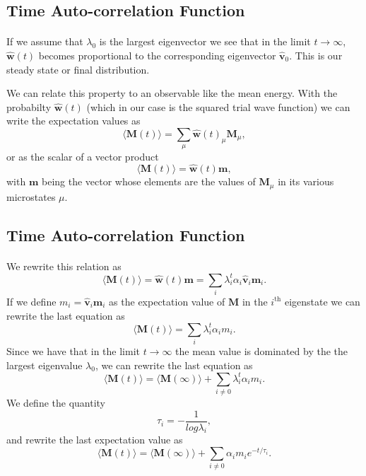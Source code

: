 \documentclass[%
oneside,                 %
final,                   %
10pt]{article}
\begin{document}
\subsection*{Time Auto-correlation Function}

\paragraph{}
If we assume that $\lambda_0$ is the largest eigenvector we see that in the limit $t\rightarrow \infty$,
$\mathbf{\hat{w}}(t)$ becomes proportional to the corresponding eigenvector 
$\mathbf{\hat{v}}_0$. This is our steady state or final distribution. 

We can relate this property to an observable like the mean energy.
With the probabilty $\mathbf{\hat{w}}(t)$ (which in our case is the squared trial wave function) we
can write the expectation values as 
\[
 \langle \mathbf{M}(t) \rangle  = \sum_{\mu} \mathbf{\hat{w}}(t)_{\mu}\mathbf{M}_{\mu},
\] 
or as the scalar of a  vector product
 \[
 \langle \mathbf{M}(t) \rangle  = \mathbf{\hat{w}}(t)\mathbf{m},
\] 
with $\mathbf{m}$ being the vector whose elements are the values of $\mathbf{M}_{\mu}$ in its 
various microstates $\mu$.



\subsection*{Time Auto-correlation Function}

\paragraph{}
We rewrite this relation  as
 \[
 \langle \mathbf{M}(t) \rangle  = \mathbf{\hat{w}}(t)\mathbf{m}=\sum_i\lambda_i^t\alpha_i\mathbf{\hat{v}}_i\mathbf{m}_i.
\] 
If we define $m_i=\mathbf{\hat{v}}_i\mathbf{m}_i$ as the expectation value of
$\mathbf{M}$ in the $i^{\mathrm{th}}$ eigenstate we can rewrite the last equation as
 \[
 \langle \mathbf{M}(t) \rangle  = \sum_i\lambda_i^t\alpha_im_i.
\] 
Since we have that in the limit $t\rightarrow \infty$ the mean value is dominated by the 
the largest eigenvalue $\lambda_0$, we can rewrite the last equation as
 \[
 \langle \mathbf{M}(t) \rangle  = \langle \mathbf{M}(\infty) \rangle+\sum_{i\ne 0}\lambda_i^t\alpha_im_i.
\] 
We define the quantity
\[
   \tau_i=-\frac{1}{log\lambda_i},
\]
and rewrite the last expectation value as
 \[
 \langle \mathbf{M}(t) \rangle  = \langle \mathbf{M}(\infty) \rangle+\sum_{i\ne 0}\alpha_im_ie^{-t/\tau_i}.
\label{eq:finalmeanm}
\]
\end{document}
